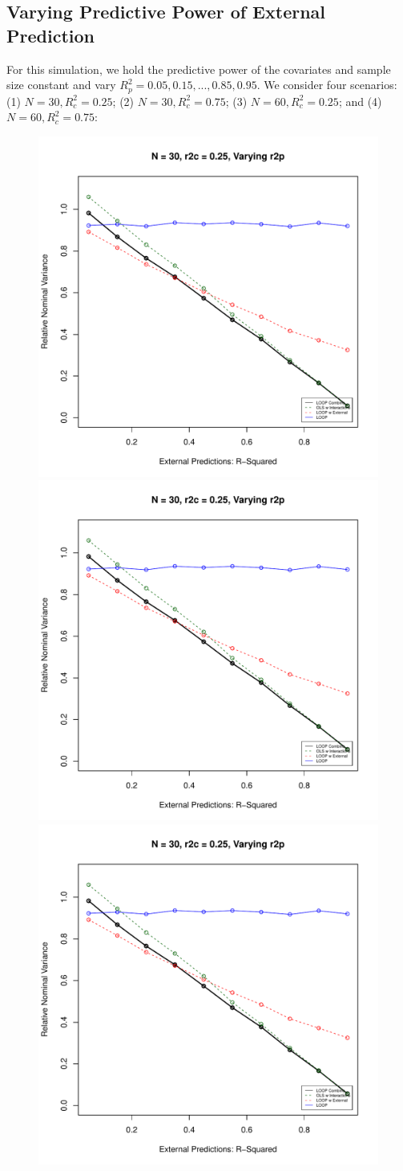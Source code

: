 \subsection{Varying Predictive Power of External Prediction}
For this simulation, we hold the predictive power of the covariates and sample size constant and vary $R^2_p = 0.05, 0.15, ..., 0.85, 0.95$. We consider four scenarios: (1) $N = 30, R^2_c = 0.25$; (2) $N = 30, R^2_c = 0.75$; (3) $N = 60, R^2_c = 0.25$; and (4) $N = 60, R^2_c = 0.75$:
\begin{figure}[H]
	\centering
	\includegraphics[width=.49\linewidth]{images/r2p.pdf} 
	\includegraphics[width=.49\linewidth,page = 2]{images/r2p.pdf} \quad
	\smallskip
	\includegraphics[width=.49\linewidth,page = 3]{images/r2p.pdf} 

\end{figure}
